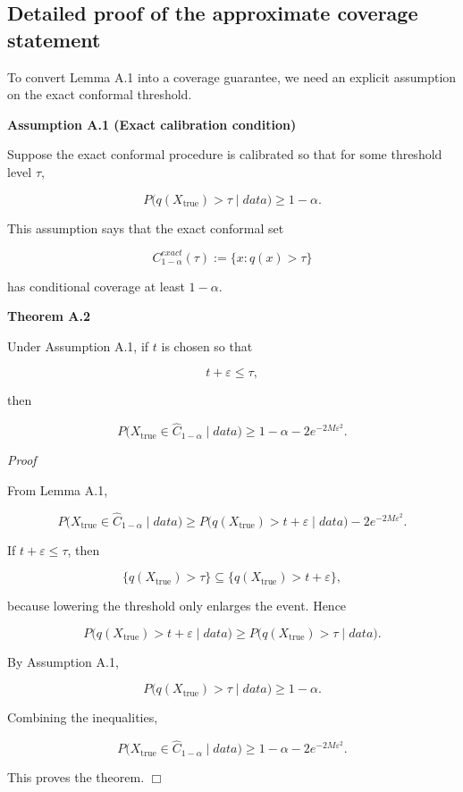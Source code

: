 \documentclass{article}
\begin{document}
\subsection{Detailed proof of the approximate coverage statement}

To convert Lemma A.1 into a coverage guarantee, we need an explicit assumption on the exact conformal threshold.

\textbf{Assumption A.1 (Exact calibration condition)}

Suppose the exact conformal procedure is calibrated so that for some threshold level $\tau$,

\[
P\bigl(q(X_{\mathrm{true}})>\tau \mid data\bigr)\ge 1-\alpha.
\]

This assumption says that the exact conformal set

\[
C_{1-\alpha}^{exact}(\tau):=\{x:q(x)>\tau\}
\]

has conditional coverage at least $1-\alpha$.

\textbf{Theorem A.2}

Under Assumption A.1, if $t$ is chosen so that

\[
t+\varepsilon\le \tau,
\]

then

\[
P\bigl(X_{\mathrm{true}}\in \hat{C}_{1-\alpha}\mid data\bigr)
\ge
1-\alpha-2e^{-2M\varepsilon^2}.
\]

\textit{Proof}

From Lemma A.1,

\[
P\bigl(X_{\mathrm{true}}\in \hat{C}_{1-\alpha}\mid data\bigr)
\ge
P\bigl(q(X_{\mathrm{true}})>t+\varepsilon \mid data\bigr)
-
2e^{-2M\varepsilon^2}.
\]

If $t+\varepsilon\le \tau$, then

\[
\{q(X_{\mathrm{true}})>\tau\}\subseteq \{q(X_{\mathrm{true}})>t+\varepsilon\},
\]

because lowering the threshold only enlarges the event. Hence

\[
P\bigl(q(X_{\mathrm{true}})>t+\varepsilon \mid data\bigr)
\ge
P\bigl(q(X_{\mathrm{true}})>\tau \mid data\bigr).
\]

By Assumption A.1,

\[
P\bigl(q(X_{\mathrm{true}})>\tau \mid data\bigr)\ge 1-\alpha.
\]

Combining the inequalities,

\[
P\bigl(X_{\mathrm{true}}\in \hat{C}_{1-\alpha}\mid data\bigr)
\ge
1-\alpha-2e^{-2M\varepsilon^2}.
\]

This proves the theorem. \hfill $\Box$
\end{document}
